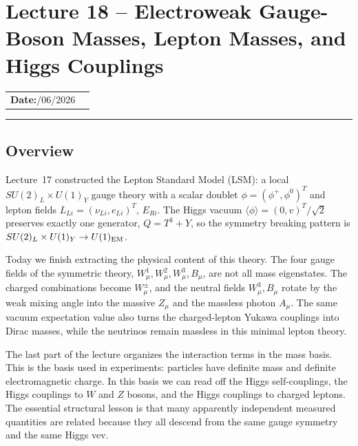 
\section{Lecture 18 -- Electroweak Gauge-Boson Masses, Lepton Masses, and Higgs Couplings}\label{sec:lec18}
\begin{center}
\begin{tabular}{ll}
  \textbf{Date:}\quad 14/06/2026 & \\
\end{tabular}
\end{center}
\hrule\vspace{1.5em}

\subsection{Overview}\label{subsec:lec18:overview}

Lecture~17 constructed the Lepton Standard Model (LSM): a local
$SU(2)_L\times U(1)_Y$ gauge theory with a scalar doublet
$\phi=(\phi^+,\phi^0)^T$ and lepton fields
$L_{Li}=(\nu_{Li},e_{Li})^T$, $E_{Ri}$. The Higgs vacuum
$\langle\phi\rangle=(0,v)^T/\sqrt2$ preserves exactly one generator,
$Q=T^3+Y$, so the symmetry breaking pattern is
$SU(2)_L\times U(1)_Y\to U(1)_{\rm EM}$.

Today we finish extracting the physical content of this theory. The four gauge
fields of the symmetric theory, $W^1_\mu,W^2_\mu,W^3_\mu,B_\mu$, are not all
mass eigenstates. The charged combinations become $W^\pm_\mu$, and the neutral
fields $W^3_\mu,B_\mu$ rotate by the weak mixing angle into the massive
$Z_\mu$ and the massless photon $A_\mu$. The same vacuum expectation value
also turns the charged-lepton Yukawa couplings into Dirac masses, while the
neutrinos remain massless in this minimal lepton theory.

The last part of the lecture organizes the interaction terms in the mass basis.
This is the basis used in experiments: particles have definite mass and
definite electromagnetic charge. In this basis we can read off the Higgs
self-couplings, the Higgs couplings to $W$ and $Z$ bosons, and the Higgs
couplings to charged leptons. The essential structural lesson is that many
apparently independent measured quantities are related because they all descend
from the same gauge symmetry and the same Higgs vev.

